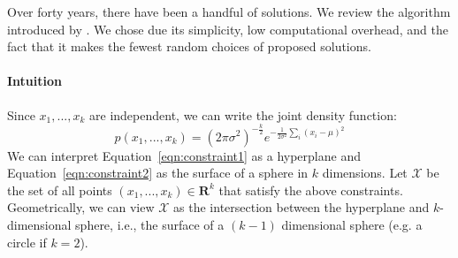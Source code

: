 Over forty years, there have been a handful of solutions. We review the algorithm introduced by \cite{marsaglia1980c69}. 
We chose \cite{marsaglia1980c69} due its simplicity, low computational overhead, and the fact that it makes the fewest random choices of proposed solutions.

\paragraph{Intuition} Since $x_1, ..., x_k$ are independent, we can write the joint density function:
\begin{equation}
    p(x_1, ..., x_k) = (2\pi \sigma^2)^{-\frac{k}{2}}e^{-\frac{1}{2\sigma^2}\sum_i(x_i - \mu)^2}
\label{eqn:joint_density}
\end{equation}
We can interpret Equation~\ref{eqn:constraint1} as a hyperplane and Equation~\ref{eqn:constraint2} as the surface of a sphere in $k$ dimensions. Let $\mathcal{X}$ be the set of all points $(x_1, ..., x_k) \in \mathbf{R}^k$ that satisfy the above constraints. Geometrically, we can view $\mathcal{X}$ as the intersection between the hyperplane and $k$-dimensional sphere, i.e., the surface of a $(k-1)$ dimensional sphere (e.g. a circle if $k=2$).

